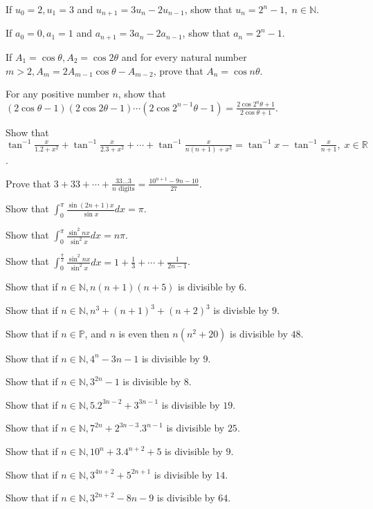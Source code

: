 \item If $u_0 = 2, u_1 = 3$ and $u_{n + 1} = 3u_n - 2u_{n - 1}$, show that $u_n = 2^n - 1,\;n\in \mathbb{N}$.
\item If $a_0 = 0, a_1 = 1$ and $a_{n + 1} = 3a_n - 2a_{n - 1}$, show that $a_n = 2^n - 1$.
\item If $A_1 = \cos\theta, A_2 = \cos2\theta$ and for every natural number $m > 2, A_m = 2A_{m-1}\cos\theta - A_{m - 2}$, prove
  that $A_n = \cos n\theta$.
\item For any positive number $n$, show that $(2\cos\theta - 1)(2\cos2\theta - 1)\cdots(2\cos2^{n - 1}\theta - 1) =
  \frac{2\cos2^n\theta + 1}{2\cos\theta + 1}$.
\item Show that $\tan^{-1}\frac{x}{1.2 + x^2} + \tan^{-1}\frac{x}{2.3 + x^2} + \cdots + \tan^{-1}\frac{x}{n(n + 1) + x^2} =
  \tan^{-1}x - \tan^{-1}\frac{x}{n + 1},\;x\in \mathbb{R}$.
\item Prove that $3 + 33 + \cdots + \frac{33\ldots3}{n\text{~digits}} = \frac{10^{n + 1} - 9n - 10}{27}$.
\item Show that $\displaystyle\int_{0}^\pi\frac{\sin(2n + 1)x}{\sin x}dx = \pi$.
\item Show that $\displaystyle\int_{0}^\pi\frac{\sin^2nx}{\sin^2x}dx = n\pi$.
\item Show that $\displaystyle\int_{0}^{\frac{\pi}{2}}\frac{\sin^2nx}{\sin^2x}dx = 1 + \frac{1}{3} + \cdots + \frac{1}{2n - 1}$.
\item Show that if $n\in\mathbb{N}, n(n + 1)(n + 5)$ is divisible by $6$.
\item Show that if $n\in\mathbb{N}, n^3 + (n + 1)^3 + (n + 2)^3$ is divisble by $9$.
\item Show that if $n\in\mathbb{P}$, and $n$ is even then $n(n^2 + 20)$ is divisible by $48$.
\item Show that if $n\in\mathbb{N}, 4^n - 3n - 1$ is divisible by $9$.
\item Show that if $n\in\mathbb{N}, 3^{2n} - 1$ is divisible by $8$.
\item Show that if $n\in\mathbb{N}, 5.2^{3n - 2} + 3^{3n - 1}$ is divisible by $19$.
\item Show that if $n\in\mathbb{N}, 7^{2n} + 2^{3n - 3}.3^{n - 1}$ is divisible by $25$.
\item Show that if $n\in\mathbb{N}, 10^n + 3.4^{n + 2} + 5$ is divisible by $9$.
\item Show that if $n\in\mathbb{N}, 3^{4n + 2} + 5^{2n + 1}$ is divisible by $14$.
\item Show that if $n\in\mathbb{N}, 3^{2n + 2} - 8n - 9$ is divisible by $64$.
